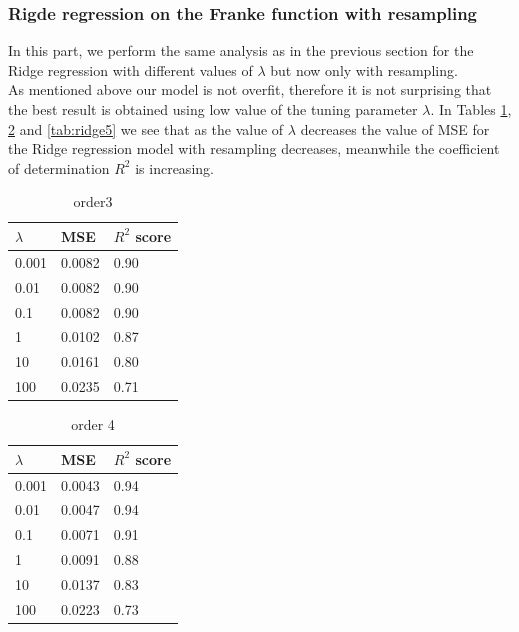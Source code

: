 \documentclass [11pt]{article}
\begin{document}
\subsubsection{Rigde regression on the Franke function  with resampling}
In this part, we perform the same analysis as in the previous section for the Ridge regression with different values of $\lambda$ but now only with resampling.\\
As mentioned above our model is not overfit, therefore it is not surprising that the best result is obtained using low value of the tuning parameter $\lambda$. In Tables \ref{tab:ridge3}, \ref{tab:ridge4} and \ref{tab:ridge5} we see that as the value of $\lambda$ decreases the value of MSE for the Ridge regression model with resampling decreases, meanwhile the coefficient of determination $R^{2}$ is increasing.
\begin{table}[H]
\centering
\begin{tabular}{lll}
\hline
$\lambda$ & MSE    & $R^{2}$ score \\ \hline
0.001     & 0.0082 & 0.90          \\
0.01      & 0.0082 & 0.90          \\
0.1       & 0.0082 & 0.90          \\
1         & 0.0102 & 0.87          \\
10        & 0.0161 & 0.80          \\
100       & 0.0235 & 0.71          \\ \hline
\end{tabular}
\caption{order3}
\label{tab:ridge3}
\end{table}

\begin{table}[H]
\centering
\begin{tabular}{lll}
\hline
$\lambda$ & MSE    & $R^{2}$ score \\ \hline
0.001     & 0.0043 & 0.94          \\
0.01      & 0.0047 & 0.94          \\
0.1       & 0.0071 & 0.91          \\
1         & 0.0091 & 0.88          \\
10        & 0.0137 & 0.83          \\
100       & 0.0223 & 0.73          \\ \hline
\end{tabular}
\caption{order 4}
\label{tab:ridge4}
\end{table}
\end{document}
